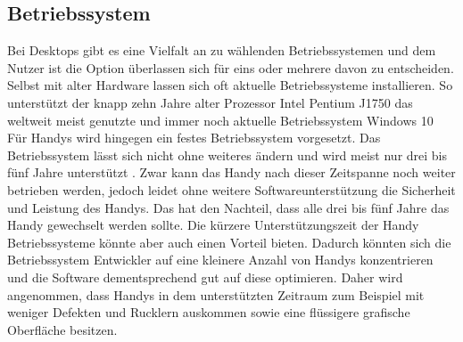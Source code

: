 \subsection{Betriebssystem}\myCheckmark
Bei Desktops gibt es eine Vielfalt an zu wählenden Betriebssystemen und dem Nutzer ist die Option überlassen sich für eins oder mehrere davon zu entscheiden. %
	Selbst mit alter Hardware lassen sich oft aktuelle Betriebssysteme installieren. So unterstützt der knapp zehn Jahre alter Prozessor Intel Pentium J1750 das weltweit meist genutzte und immer noch aktuelle Betriebssystem Windows 10\cite{pcVsphone_intelWindowsSupport, pcVsphone_destkopOperatingSystem, pcVsphone_windowsVersions}\newline%
Für Handys wird hingegen ein festes Betriebssystem vorgesetzt. %
	Das Betriebssystem lässt sich nicht ohne weiteres ändern und wird meist nur drei bis fünf Jahre unterstützt \cite{pcVsphone_deviceSupportGoogle}\cite{pcVsphone_deviceSupportApple}. %
		Zwar kann das Handy nach dieser Zeitspanne noch weiter betrieben werden, jedoch leidet ohne weitere Softwareunterstützung die Sicherheit und Leistung des Handys. Das hat den Nachteil, dass alle drei bis fünf Jahre das Handy gewechselt werden sollte.\newline%
		Die kürzere Unterstützungszeit der Handy Betriebssysteme könnte aber auch einen Vorteil bieten. Dadurch könnten sich die Betriebssystem Entwickler auf eine kleinere Anzahl von Handys konzentrieren und die Software dementsprechend gut auf diese optimieren. Daher wird angenommen, dass Handys in dem unterstützten Zeitraum zum Beispiel mit weniger Defekten und Rucklern auskommen sowie eine flüssigere grafische Oberfläche besitzen.\newline%








